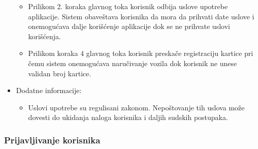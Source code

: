\begin{itemize}
        \begin{itemize}
            \item Prilikom 2. koraka glavnog toka korisnik odbija uslove upotrebe aplikacije. Sistem obaveštava korisnika da mora da prihvati date uslove i onemogućava dalje korišćenje aplikacije dok se ne prihvate uslovi korišćenja.
            \item Prilikom koraka 4 glavnog toka korisnik preskače registraciju kartice pri čemu sistem onemogućava naručivanje vozila dok korisnik ne unese validan broj kartice.
        \end{itemize}
    \item Dodatne informacije:
        \begin{itemize}
            \item Uslovi upotrebe su regulisani zakonom. Nepoštovanje tih uslova može dovesti do ukidanja naloga korisnika i daljih sudskih postupaka.
        \end{itemize}
\end{itemize}


\subsubsection{\bfseries Prijavljivanje korisnika}

